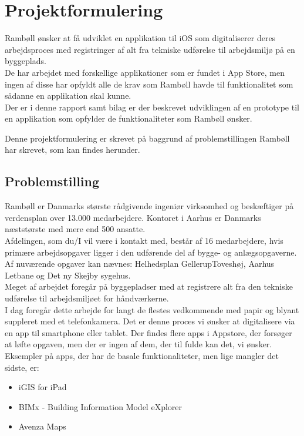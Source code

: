 \chapter{Projektformulering}
Rambøll ønsker at få udviklet en applikation til iOS som digitaliserer deres arbejdsproces med registringer af alt fra tekniske udførelse til arbejdsmiljø på en byggeplads. \\
De har arbejdet med forskellige applikationer som er fundet i App Store, men ingen af disse har opfyldt alle de krav som Rambøll havde til funktionalitet som sådanne en applikation skal kunne. \\
Der er i denne rapport samt bilag er der beskrevet udviklingen af en prototype til en applikation som opfylder de funktionaliteter som Rambøll ønsker.

Denne projektformulering er skrevet på baggrund af problemstillingen Rambøll har skrevet, som kan findes herunder. \\

\section{Problemstilling}
Rambøll er Danmarks største rådgivende ingeniør virksomhed og beskæftiger på verdensplan over 13.000
medarbejdere. Kontoret i Aarhus er Danmarks næststørste med mere end 500 ansatte.\\
Afdelingen, som du/I vil være i kontakt med, består af 16 medarbejdere, hvis primære arbejdsopgaver ligger i
den udførende del af bygge- og anlægsopgaverne. Af nuværende opgaver kan nævnes: Helhedsplan GellerupToveshøj,
Aarhus Letbane og Det ny Skejby sygehus.\\
Meget af arbejdet foregår på byggepladser med at registrere alt fra den tekniske udførelse til arbejdsmiljøet for
håndværkerne.\\
I dag foregår dette arbejde for langt de flestes vedkommende med papir og blyant suppleret med et
telefonkamera.
Det er denne proces vi ønsker at digitalisere via en app til smartphone eller tablet.
Der findes flere apps i Appstore, der forsøger at løfte opgaven, men der er ingen af dem, der til fulde kan det, vi
ønsker. Eksempler på apps, der har de basale funktionaliteter, men lige mangler det sidste, er:
\begin{itemize}[-]
	\item iGIS for iPad 
	\item BIMx - Building Information Model eXplorer
	\item Avenza Maps
\end{itemize}

